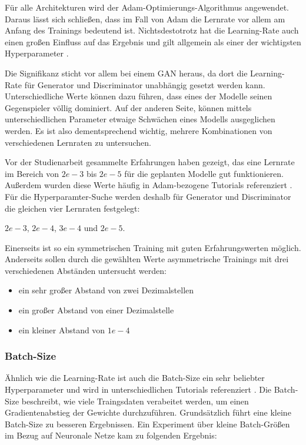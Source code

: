 Für alle Architekturen wird der Adam-Optimierungs-Algorithmus angewendet.
Daraus lässt sich schließen, dass im Fall von Adam die Lernrate vor allem am Anfang des Trainings bedeutend ist.
Nichtsdestotrotz hat die Learning-Rate auch einen großen Einfluss auf das Ergebnis und gilt allgemein als einer der wichtigsten Hyperparameter \cite[S. 447]{learning-rate-most-important}. 
\newline

Die Signifikanz sticht vor allem bei einem GAN heraus, da dort die Learning-Rate für Generator und Discriminator unabhängig gesetzt werden kann.
Unterschiedliche Werte können dazu führen, dass eines der Modelle seinen Gegenspieler völlig dominiert.
Auf der anderen Seite, können mittels unterschiedlichen Parameter etwaige Schwächen eines Modells ausgeglichen werden.
Es ist also dementsprechend wichtig, mehrere Kombinationen von verschiedenen Lernraten zu untersuchen.
\newline

Vor der Studienarbeit gesammelte Erfahrungen haben gezeigt, das eine Lernrate im Bereich von \(2e-3\) bis \(2e-5\) für die geplanten Modelle gut funktionieren.
Außerdem wurden diese Werte häufig in Adam-bezogene Tutorials referenziert \cite{adam-tutorial}.
Für die Hyperparamter-Suche werden deshalb für Generator und Discriminator die gleichen vier Lernraten festgelegt:

\begin{center} \(2e-3\), \(2e-4\), \(3e-4\) und \(2e-5\). \end{center}
 
Einerseits ist so ein symmetrischen Training mit guten Erfahrungswerten möglich.
Anderseits sollen durch die gewählten Werte asymmetrische Trainings mit drei verschiedenen Abständen untersucht werden:
\begin{itemize}
	\item ein sehr großer Abstand von zwei Dezimalstellen
	\item ein großer Abstand von einer Dezimalstelle
	\item ein kleiner Abstand von \(1e-4\)
\end{itemize}	

\subsubsection{Batch-Size}
Ähnlich wie die Learning-Rate ist auch die Batch-Size ein sehr beliebter Hyperparameter und wird in unterschiedlichen Tutorials referenziert \cite{tutorial:tune-batch-size-analyticsvidhya, tutorial:tune-batch-size-machinelearningmastery}.
Die Batch-Size beschreibt, wie viele Traingsdaten verabeitet werden, um einen Gradientenabstieg der Gewichte durchzuführen.
Grundsätzlich führt eine kleine Batch-Size zu besseren Ergebnissen.
Ein Experiment über kleine Batch-Größen im Bezug auf Neuronale Netze kam zu folgenden Ergebnis: 

